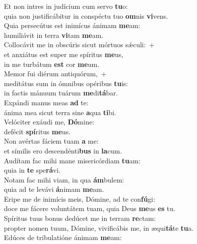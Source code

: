 \evenverse Et non intres in judícium cum servo \textbf{tu}o:~\*\\
\evenverse quia non justificábitur in conspéctu tuo \textbf{om}nis \textbf{vi}vens.\\
\oddverse Quia persecútus est inimícus ánimam \textbf{me}am:~\*\\
\oddverse humiliávit in terra \textbf{vi}tam \textbf{me}am.\\
\evenverse Collocávit me in obscúris sicut mórtuos sǽculi:~+\\
\evenverse  et anxiátus est super me spíritus \textbf{me}us,~\*\\
\evenverse in me turbátum \textbf{est} cor \textbf{me}um.\\
\oddverse Memor fui diérum antiquórum,~+\\
\oddverse  meditátus sum in ómnibus opéribus \textbf{tu}is:~\*\\
\oddverse in factis mánuum tuárum \textbf{me}di\textbf{tá}bar.\\
\evenverse Expándi manus meas \textbf{ad} te:~\*\\
\evenverse ánima mea sicut terra sine \textbf{a}qua \textbf{ti}bi.\\
\oddverse Velóciter exáudi me, \textbf{Dó}mine:~\*\\
\oddverse defécit \textbf{spí}ritus \textbf{me}us.\\
\evenverse Non avértas fáciem tuam \textbf{a} me:~\*\\
\evenverse et símilis ero descendénti\textbf{bus} in \textbf{la}cum.\\
\oddverse Audítam fac mihi mane misericórdiam \textbf{tu}am:~\*\\
\oddverse quia in \textbf{te} spe\textbf{rá}vi.\\
\evenverse Notam fac mihi viam, in qua \textbf{ám}bulem:~\*\\
\evenverse quia ad te levávi \textbf{á}nimam \textbf{me}am.\\
\oddverse Eripe me de inimícis meis, Dómine, ad te con\textbf{fú}gi:~\*\\
\oddverse doce me fácere voluntátem tuam, quia Deus \textbf{me}us \textbf{es} tu.\\
\evenverse Spíritus tuus bonus dedúcet me in terram \textbf{re}ctam:~\*\\
\evenverse propter nomen tuum, Dómine, vivificábis me, in æqui\textbf{tá}te \textbf{tu}a.\\
\oddverse Edúces de tribulatióne ánimam \textbf{me}am:~\*\\

